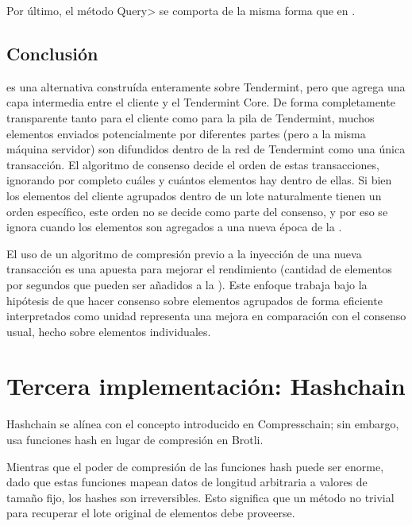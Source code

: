 %

Por último, el método \<Query> se comporta de la misma forma que en \vanilla.

\subsection{Conclusión}
\compresschain es una alternativa construída enteramente sobre Tendermint, pero que agrega una capa
intermedia entre el cliente y el Tendermint Core.
De forma completamente transparente tanto para el
cliente como para la pila de Tendermint, muchos elementos enviados potencialmente por diferentes partes
(pero a la misma máquina servidor)
son difundidos dentro de la red de Tendermint como una única transacción.
El algoritmo de consenso
decide el orden de estas transacciones, ignorando por completo cuáles y cuántos elementos hay dentro de ellas.
Si bien los elementos del cliente agrupados dentro de un lote naturalmente tienen un orden específico,
este orden no se decide como parte del consenso, y por eso se ignora cuando los elementos son agregados
a una nueva época de la \setchain.

%

El uso de un algoritmo de compresión previo a la inyección de una nueva transacción es una apuesta para mejorar
el rendimiento (cantidad de elementos por segundos que pueden ser añadidos a la \setchain).
Este enfoque trabaja bajo la hipótesis
de que hacer consenso sobre elementos agrupados de forma eficiente interpretados como unidad representa una
mejora en comparación con el consenso usual, hecho sobre elementos individuales.

\section{Tercera implementación: Hashchain}\label{sec:hashchain}
%
Hashchain se alínea con el concepto introducido en Compresschain; sin embargo, usa
funciones hash en lugar de compresión en Brotli.

%
Mientras que el poder de compresión de las funciones hash puede ser enorme, dado que estas funciones
mapean datos de longitud arbitraria a valores de tamaño fijo, los hashes son irreversibles. Esto
significa que un método no trivial para recuperar el lote original de elementos debe proveerse.

